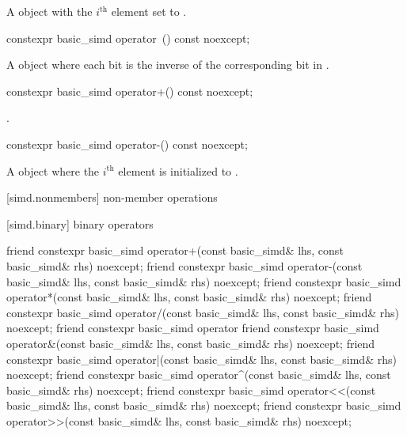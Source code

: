 \begin{itemdescr}
  \pnum{}

  \pnum\returns
  A  object with the $i^\text{th}$ element set to  \foralli.
\end{itemdescr}

\begin{itemdecl}
constexpr basic_simd operator~() const noexcept;
\end{itemdecl}

\begin{itemdescr}
  \pnum{}

  \pnum\returns
  A  object where each bit is the inverse of the corresponding bit in .
\end{itemdescr}

\begin{itemdecl}
constexpr basic_simd operator+() const noexcept;
\end{itemdecl}

\begin{itemdescr}
  \pnum{}

  \pnum\returns
  .
\end{itemdescr}

\begin{itemdecl}
constexpr basic_simd operator-() const noexcept;
\end{itemdecl}

\begin{itemdescr}
  \pnum{}

  \pnum\returns
  A  object where the $i^\text{th}$ element is initialized to  \foralli.
\end{itemdescr}

[simd.nonmembers]{ non-member operations}

[simd.binary]{ binary operators}

\begin{itemdecl}
friend constexpr basic_simd operator+(const basic_simd& lhs, const basic_simd& rhs) noexcept;
friend constexpr basic_simd operator-(const basic_simd& lhs, const basic_simd& rhs) noexcept;
friend constexpr basic_simd operator*(const basic_simd& lhs, const basic_simd& rhs) noexcept;
friend constexpr basic_simd operator/(const basic_simd& lhs, const basic_simd& rhs) noexcept;
friend constexpr basic_simd operator%
friend constexpr basic_simd operator&(const basic_simd& lhs, const basic_simd& rhs) noexcept;
friend constexpr basic_simd operator|(const basic_simd& lhs, const basic_simd& rhs) noexcept;
friend constexpr basic_simd operator^(const basic_simd& lhs, const basic_simd& rhs) noexcept;
friend constexpr basic_simd operator<<(const basic_simd& lhs, const basic_simd& rhs) noexcept;
friend constexpr basic_simd operator>>(const basic_simd& lhs, const basic_simd& rhs) noexcept;
\end{itemdecl}

